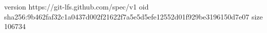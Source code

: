 version https://git-lfs.github.com/spec/v1
oid sha256:9b462faf32c1a0437d002f21622f7a5e5d5efe12552d01f929be3196150d7e07
size 106734

